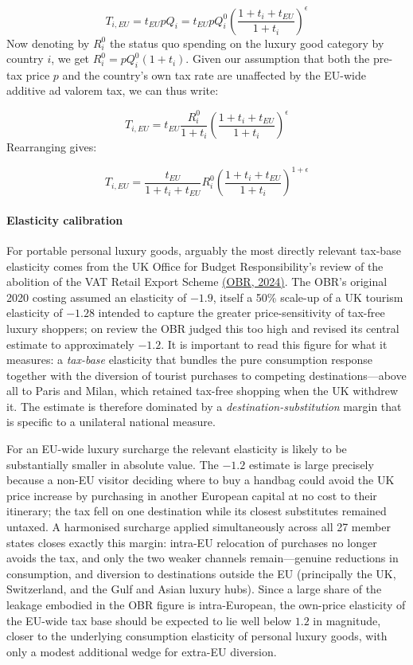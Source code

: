 \documentclass[../../main]{subfiles}
\begin{document}
\[
T_{i,EU}=t_{EU} p Q_i=t_{EU} p Q_i^0 \left(\frac{1+t_i+t_{EU}}{1+t_i}\right)^{\epsilon}
\]
Now denoting by $R_i^0$ the status quo spending on the luxury good category by country $i$, we get $R_i^0=p Q_i^0 (1+t_i)$. Given our assumption that both the pre-tax price $p$ and the country's own tax rate are unaffected by the EU-wide additive ad valorem tax, we can thus write:

\[
T_{i,EU}=t_{EU} \frac{R_i^0}{1+t_i} \left(\frac{1+t_i+t_{EU}}{1+t_i}\right)^{\epsilon}
\]
Rearranging gives:

\[
T_{i,EU}=\frac{t_{EU}}{1+t_i+t_{EU}} R_i^0 \left(\frac{1+t_i+t_{EU}}{1+t_i}\right)^{1+\epsilon}
\]

\paragraph{Elasticity calibration} %

For portable personal luxury goods, arguably the most directly relevant tax-base elasticity comes from the UK Office for
Budget Responsibility's review of the abolition of the VAT Retail Export Scheme
\href{https://obr.uk/box/vat-retail-export-scheme-review-of-the-2020-policy-costing/}{(OBR,
2024)}. The OBR's original 2020 costing assumed an elasticity of $-1.9$, itself
a 50\% scale-up of a UK tourism elasticity of $-1.28$ intended to capture the
greater price-sensitivity of tax-free luxury shoppers; on review the OBR judged
this too high and revised its central estimate to approximately $-1.2$. It is
important to read this figure for what it measures: a \emph{tax-base} elasticity
that bundles the pure consumption response together with the diversion of
tourist purchases to competing destinations---above all to Paris and Milan,
which retained tax-free shopping when the UK withdrew it. The estimate is
therefore dominated by a \emph{destination-substitution} margin that is specific
to a unilateral national measure.

For an EU-wide luxury surcharge the relevant elasticity is likely to be
substantially smaller in absolute value. The $-1.2$ estimate is large precisely
because a non-EU visitor deciding where to buy a handbag could avoid the UK
price increase by purchasing in another European capital at no cost to their
itinerary; the tax fell on one destination while its closest substitutes
remained untaxed. A harmonised surcharge applied simultaneously across all 27
member states closes exactly this margin: intra-EU relocation of purchases no
longer avoids the tax, and only the two weaker channels remain---genuine
reductions in consumption, and diversion to destinations outside the EU
(principally the UK, Switzerland, and the Gulf and Asian luxury hubs). Since a
large share of the leakage embodied in the OBR figure is intra-European, the
own-price elasticity of the EU-wide tax base should be expected to lie well
below $1.2$ in magnitude, closer to the underlying consumption elasticity of
personal luxury goods, with only a modest additional wedge for extra-EU
diversion.
\end{document}
